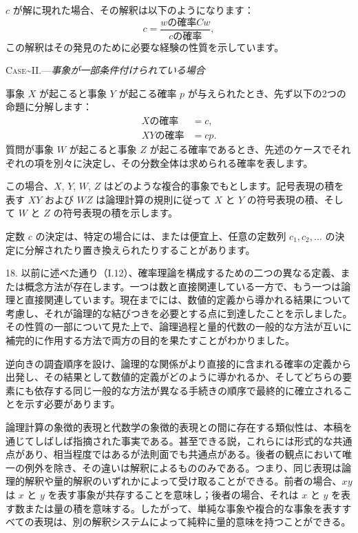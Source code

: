 \documentclass[a4paper,11pt,openany]{ltjsbook}
\begin{document}
$c$ が解に現れた場合、その解釈は以下のようになります：
\[
  c = \frac{w の確率 C w}{c の確率},
\]
この解釈はその発見のために必要な経験の性質を示しています。

\textsc{Case\textasciitilde{}II.}---\emph{事象が一部条件付けられている場合}

事象 $X$ が起こると事象 $Y$ が起こる確率 $p$ が与えられたとき、先ず以下の2つの命題に分解します：
\[
\begin{array}{cccccc}
  X の確率 &= c,   \\
  XY の確率 &= cp.
\end{array}
\]
質問が事象 $W$ が起こると事象 $Z$ が起こる確率であるとき、先述のケースでそれぞれの項を別々に決定し、その分数全体は求められる確率を表します。%

この場合、$X$, $Y$, $W$, $Z$ はどのような複合的事象でもとします。記号表現の積を表す $XY$ および $WZ$ は論理計算の規則に従って $X$ と $Y$ の符号表現の積、そして $W$ と $Z$ の符号表現の積を示します。

定数 $c$ の決定は、特定の場合には、または便宜上、任意の定数列 $c_1, c_2, \dotsc$ の決定に分解されたり置き換えられたりすることがあります。

18. 以前に述べた通り（I.12）、確率理論を構成するための二つの異なる定義、または概念方法が存在します。一つは数と直接関連している一方で、もう一つは論理と直接関連しています。現在までには、数値的定義から導かれる結果について考慮し、それが論理的な結びつきを必要とする点に到達したことを示しました。その性質の一部について見た上で、論理過程と量的代数の一般的な方法が互いに補完的に作用する方法で両方の目的を果たすことがわかりました。

逆向きの調査順序を設け、論理的な関係がより直接的に含まれる確率の定義から出発し、その結果として数値的定義がどのように導かれるか、そしてどちらの要素にも依存する同じ一般的な方法が異なる手続きの順序で最終的に確立されることを示す必要があります。

論理計算の象徴的表現と代数学の象徴的表現との間に存在する類似性は、本稿を通じてしばしば指摘された事実である。甚至できる説，これらには形式的な共通点があり、相当程度ではあるが法則面でも共通点がある。後者の観点において唯一の例外を除き、その違いは解釈によるもののみである。つまり、同じ表現は論理的解釈や量的解釈のいずれかによって受け取ることができる。前者の場合、$xy$ は $x$ と $y$ を表す事象が共存することを意味し；後者の場合、それは $x$ と $y$ を表す数または量の積を意味する。したがって、単純な事象や複合的な事象を表すすべての表現は、別の解釈システムによって純粋に量的意味を持つことができる。
\end{document}
